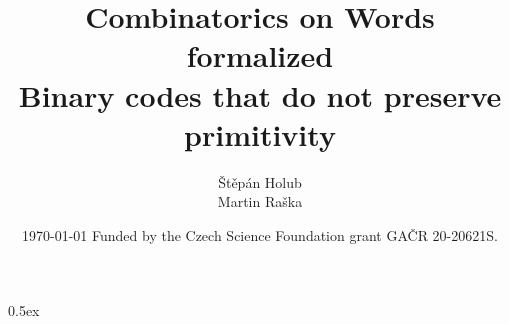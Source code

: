 \documentclass[11pt,a4paper]{report}
\begin{document}
\title{Combinatorics on Words formalized \\ Binary codes that do not preserve primitivity}
\author{Štěpán Holub \\ Martin Raška }
  

 \date{ \today
 \vfill
  Funded by the Czech Science Foundation grant GA\v CR 20-20621S.}
  
\maketitle


\tableofcontents
\vspace{\baselineskip}

\parindent 0pt\parskip 0.5ex



\cleardoublepage
{}
{}
\renewcommand{\bibname}{References}


\end{document}
